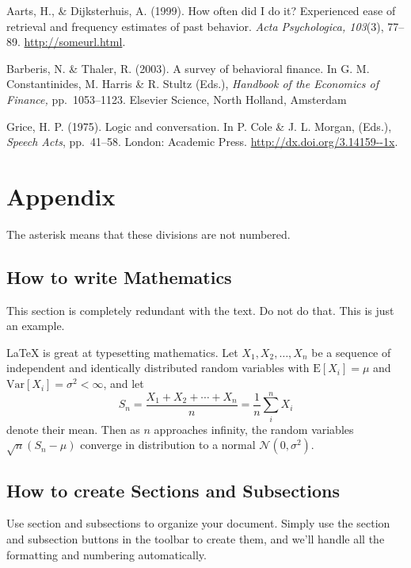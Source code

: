 \documentclass[12pt]{article}
\begin{document}
\begin{hangparas}{1em}{1}

  Aarts, H., \& Dijksterhuis, A. (1999).  How often did I do it?
  Experienced ease of retrieval and frequency estimates of past
  behavior.  \textit{Acta Psychologica, 103}(3), 77--89. \url{http://someurl.html}.

  Barberis, N. \& Thaler, R. (2003). A survey of behavioral finance.
  In G. M. Constantinides, M. Harris \& R. Stultz (Eds.),
  \textit{Handbook of the Economics of Finance,} pp.\ 1053--1123.
  Elsevier Science, North Holland, Amsterdam

\vfill %
\break

Grice, H. P. (1975).  Logic and conversation. In P. Cole \& J.
L. Morgan, (Eds.), \textit{Speech Acts}, pp.\ 41--58. London: Academic
Press. \url{http://dx.doi.org/3.14159--1x}.
\end{hangparas}

\bigskip
\section*{Appendix}

The asterisk means that these divisions are not numbered.

\subsection*{How to write Mathematics}

This section is completely redundant with the text. Do not do
that. This is just an example.

\LaTeX{} is great at typesetting mathematics. Let $X_1, X_2, \ldots, X_n$ be a sequence of independent and identically distributed random variables with $\text{E}[X_i] = \mu$ and $\text{Var}[X_i] = \sigma^2 < \infty$, and let
\[S_n = \frac{X_1 + X_2 + \cdots + X_n}{n}
      = \frac{1}{n}\sum_{i}^{n} X_i\]
denote their mean. Then as $n$ approaches infinity, the random variables $\sqrt{n}(S_n - \mu)$ converge in distribution to a normal $\mathcal{N}(0, \sigma^2)$.


\subsection*{How to create Sections and Subsections}

Use section and subsections to organize your document. Simply use the section and subsection buttons in the toolbar to create them, and we'll handle all the formatting and numbering automatically.
\end{document}
